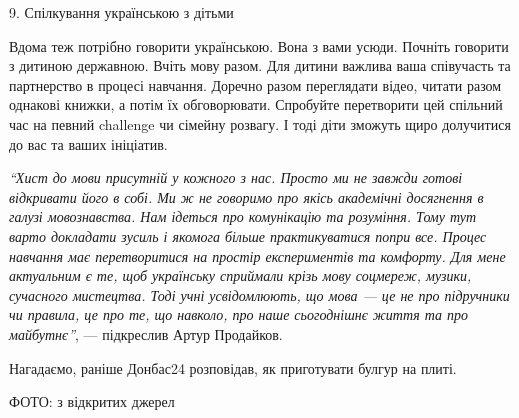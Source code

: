 9. Спілкування українською з дітьми

Вдома теж потрібно говорити українською. Вона з вами усюди. Почніть говорити з
дитиною державною. Вчіть мову разом. Для дитини важлива ваша співучасть та
партнерство в процесі навчання. Доречно разом переглядати відео, читати разом
однакові книжки, а потім їх обговорювати. Спробуйте перетворити цей спільний
час на певний challenge чи сімейну розвагу. І тоді діти зможуть щиро долучитися
до вас та ваших ініціатив.

\begin{leftbar}
\emph{\enquote{Хист до мови присутній у кожного з нас. Просто ми не завжди готові відкривати
його в собі. Ми ж не говоримо про якісь академічні досягнення в галузі
мовознавства. Нам ідеться про комунікацію та розуміння. Тому тут варто
докладати зусиль і якомога більше практикуватися попри все. Процес навчання має
перетворитися на простір експериментів та комфорту. Для мене актуальним є те,
щоб українську сприймали крізь мову соцмереж, музики, сучасного мистецтва. Тоді
учні усвідомлюють, що мова — це не про підручники чи правила, це про те, що
навколо, про наше сьогоднішнє життя та про майбутнє}}, — підкреслив Артур
Продайков.
\end{leftbar}


Нагадаємо, раніше Донбас24 розповідав, як приготувати булгур на плиті.

ФОТО: з відкритих джерел

